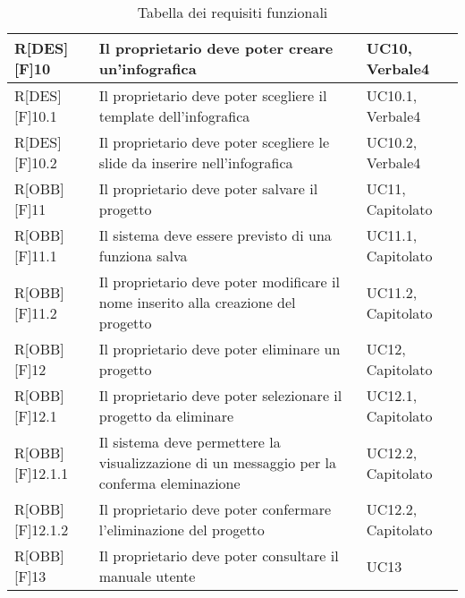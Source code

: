 	\begin{table}[h]
		\begin{tabular}{|p{}|p{}|p{}|}
			\midrule

			R[DES][F]10 & Il proprietario deve poter creare un'\gls{infografica} & UC10, Verbale4 \\ \midrule
			R[DES][F]10.1 & Il proprietario deve poter scegliere il \gls{template} dell'\gls{infografica} & UC10.1, Verbale4 \\ \midrule
			R[DES][F]10.2 & Il proprietario deve poter scegliere le \gls{slide} da inserire nell'\gls{infografica} & UC10.2, Verbale4 \\ \midrule
			R[OBB][F]11 & Il proprietario deve poter salvare il progetto & UC11, Capitolato  \\ \midrule
			R[OBB][F]11.1 & Il sistema deve essere previsto di una funziona salva & UC11.1, Capitolato \\ \midrule
			R[OBB][F]11.2 & Il proprietario deve poter modificare il nome inserito alla creazione del progetto & UC11.2, Capitolato \\ \midrule
			R[OBB][F]12 & Il proprietario deve poter eliminare un progetto & UC12, Capitolato \\ \midrule
			R[OBB][F]12.1 & Il proprietario deve poter selezionare il progetto da eliminare & UC12.1, Capitolato \\ \midrule
			R[OBB][F]12.1.1 & Il sistema deve permettere la visualizzazione di un messaggio per la conferma eleminazione & UC12.2, Capitolato \\ \midrule
			R[OBB][F]12.1.2 & Il proprietario deve poter confermare l'eliminazione del progetto  & UC12.2, Capitolato \\ \midrule
			R[OBB][F]13 & Il proprietario deve poter consultare il manuale utente & UC13 \\

			\bottomrule

		\end{tabular}
		\caption{Tabella dei requisiti funzionali}
	\end{table}
	\newpage
